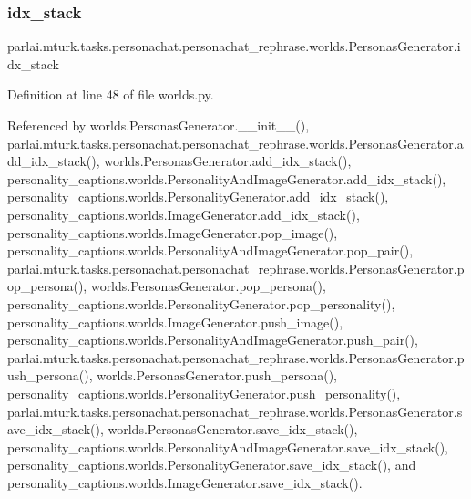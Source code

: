 \subsubsection{\texorpdfstring{idx\+\_\+stack}{idx\_stack}}
{\footnotesize\ttfamily parlai.\+mturk.\+tasks.\+personachat.\+personachat\+\_\+rephrase.\+worlds.\+Personas\+Generator.\+idx\+\_\+stack}



Definition at line 48 of file worlds.\+py.



Referenced by worlds.\+Personas\+Generator.\+\_\+\+\_\+init\+\_\+\+\_\+(), parlai.\+mturk.\+tasks.\+personachat.\+personachat\+\_\+rephrase.\+worlds.\+Personas\+Generator.\+add\+\_\+idx\+\_\+stack(), worlds.\+Personas\+Generator.\+add\+\_\+idx\+\_\+stack(), personality\+\_\+captions.\+worlds.\+Personality\+And\+Image\+Generator.\+add\+\_\+idx\+\_\+stack(), personality\+\_\+captions.\+worlds.\+Personality\+Generator.\+add\+\_\+idx\+\_\+stack(), personality\+\_\+captions.\+worlds.\+Image\+Generator.\+add\+\_\+idx\+\_\+stack(), personality\+\_\+captions.\+worlds.\+Image\+Generator.\+pop\+\_\+image(), personality\+\_\+captions.\+worlds.\+Personality\+And\+Image\+Generator.\+pop\+\_\+pair(), parlai.\+mturk.\+tasks.\+personachat.\+personachat\+\_\+rephrase.\+worlds.\+Personas\+Generator.\+pop\+\_\+persona(), worlds.\+Personas\+Generator.\+pop\+\_\+persona(), personality\+\_\+captions.\+worlds.\+Personality\+Generator.\+pop\+\_\+personality(), personality\+\_\+captions.\+worlds.\+Image\+Generator.\+push\+\_\+image(), personality\+\_\+captions.\+worlds.\+Personality\+And\+Image\+Generator.\+push\+\_\+pair(), parlai.\+mturk.\+tasks.\+personachat.\+personachat\+\_\+rephrase.\+worlds.\+Personas\+Generator.\+push\+\_\+persona(), worlds.\+Personas\+Generator.\+push\+\_\+persona(), personality\+\_\+captions.\+worlds.\+Personality\+Generator.\+push\+\_\+personality(), parlai.\+mturk.\+tasks.\+personachat.\+personachat\+\_\+rephrase.\+worlds.\+Personas\+Generator.\+save\+\_\+idx\+\_\+stack(), worlds.\+Personas\+Generator.\+save\+\_\+idx\+\_\+stack(), personality\+\_\+captions.\+worlds.\+Personality\+And\+Image\+Generator.\+save\+\_\+idx\+\_\+stack(), personality\+\_\+captions.\+worlds.\+Personality\+Generator.\+save\+\_\+idx\+\_\+stack(), and personality\+\_\+captions.\+worlds.\+Image\+Generator.\+save\+\_\+idx\+\_\+stack().

\mbox{\label{classparlai_1_1mturk_1_1tasks_1_1personachat_1_1personachat__rephrase_1_1worlds_1_1PersonasGenerator_a47aadd2ff6148aa086887f039f046224}} 
